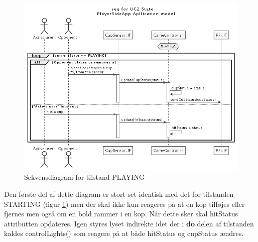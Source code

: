 \documentclass[Arkitektur/System_main.tex]{subfiles}
\begin{document}
\begin{figure}[H]
    \centering
    \includegraphics[width=\textwidth]{Arkitektur/Softwarearkitektur/Applikationsmodel/PlayerSide/graphics/UC2_sequence.png}
    \caption{Sekvensdiagram for tilstand PLAYING}
    \label{fig:playerSide_PLAYING_SD}
\end{figure}
Den første del af dette diagram er stort set identisk med det for tilstanden STARTING (figur \ref{fig:playerSide_PLAYING_SD}) men der skal ikke kun reageres på at en kop tilføjes eller fjernes men også om en bold rammer i en kop. Når dette sker skal hitStatus attributten opdateres. Igen styres lyset indirekte idet der i \textbf{do} delen af tilstanden kaldes controlLights() som reagere på at både hitStatus og cupStatus ændres.
\end{document}
